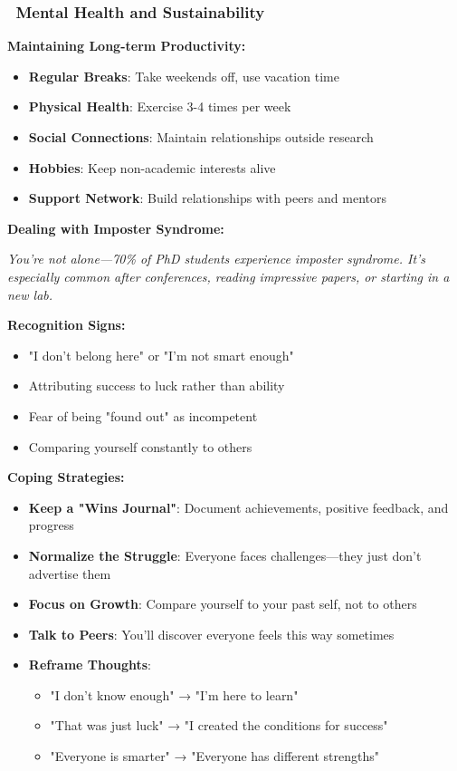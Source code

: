\documentclass[11pt,a4paper]{article}
\begin{document}
\subsubsection{\faHeart~Mental Health and Sustainability}

\textbf{Maintaining Long-term Productivity:}
\begin{itemize}
    \item \textbf{Regular Breaks}: Take weekends off, use vacation time
    \item \textbf{Physical Health}: Exercise 3-4 times per week
    \item \textbf{Social Connections}: Maintain relationships outside research
    \item \textbf{Hobbies}: Keep non-academic interests alive
    \item \textbf{Support Network}: Build relationships with peers and mentors
\end{itemize}

\textbf{Dealing with Imposter Syndrome:}

\textit{You're not alone—70\% of PhD students experience imposter syndrome. It's especially common after conferences, reading impressive papers, or starting in a new lab.}

\textbf{Recognition Signs:}
\begin{itemize}
    \item "I don't belong here" or "I'm not smart enough"
    \item Attributing success to luck rather than ability
    \item Fear of being "found out" as incompetent
    \item Comparing yourself constantly to others
\end{itemize}

\textbf{Coping Strategies:}
\begin{itemize}
    \item \textbf{Keep a "Wins Journal"}: Document achievements, positive feedback, and progress
    \item \textbf{Normalize the Struggle}: Everyone faces challenges—they just don't advertise them
    \item \textbf{Focus on Growth}: Compare yourself to your past self, not to others
    \item \textbf{Talk to Peers}: You'll discover everyone feels this way sometimes
    \item \textbf{Reframe Thoughts}: 
    \begin{itemize}
        \item "I don't know enough" → "I'm here to learn"
        \item "That was just luck" → "I created the conditions for success"
        \item "Everyone is smarter" → "Everyone has different strengths"
    \end{itemize}
\end{itemize}
\end{document}

